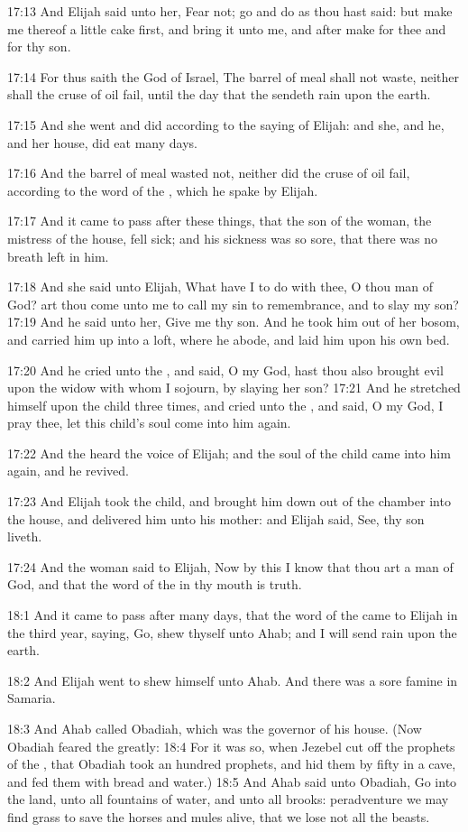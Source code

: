 17:13 And Elijah said unto her, Fear not; go and do as thou hast said:
but make me thereof a little cake first, and bring it unto me, and
after make for thee and for thy son.

17:14 For thus saith the \LORD God of Israel, The barrel of meal shall
not waste, neither shall the cruse of oil fail, until the day that the
\LORD sendeth rain upon the earth.

17:15 And she went and did according to the saying of Elijah: and she,
and he, and her house, did eat many days.

17:16 And the barrel of meal wasted not, neither did the cruse of oil
fail, according to the word of the \LORD, which he spake by Elijah.

17:17 And it came to pass after these things, that the son of the
woman, the mistress of the house, fell sick; and his sickness was so
sore, that there was no breath left in him.

17:18 And she said unto Elijah, What have I to do with thee, O thou
man of God? art thou come unto me to call my sin to remembrance, and
to slay my son?  17:19 And he said unto her, Give me thy son. And he
took him out of her bosom, and carried him up into a loft, where he
abode, and laid him upon his own bed.

17:20 And he cried unto the \LORD, and said, O \LORD my God, hast thou
also brought evil upon the widow with whom I sojourn, by slaying her
son?  17:21 And he stretched himself upon the child three times, and
cried unto the \LORD, and said, O \LORD my God, I pray thee, let this
child's soul come into him again.

17:22 And the \LORD heard the voice of Elijah; and the soul of the
child came into him again, and he revived.

17:23 And Elijah took the child, and brought him down out of the
chamber into the house, and delivered him unto his mother: and Elijah
said, See, thy son liveth.

17:24 And the woman said to Elijah, Now by this I know that thou art a
man of God, and that the word of the \LORD in thy mouth is truth.

18:1 And it came to pass after many days, that the word of the \LORD
came to Elijah in the third year, saying, Go, shew thyself unto Ahab;
and I will send rain upon the earth.

18:2 And Elijah went to shew himself unto Ahab. And there was a sore
famine in Samaria.

18:3 And Ahab called Obadiah, which was the governor of his house.
(Now Obadiah feared the \LORD greatly: 18:4 For it was so, when Jezebel
cut off the prophets of the \LORD, that Obadiah took an hundred
prophets, and hid them by fifty in a cave, and fed them with bread and
water.)  18:5 And Ahab said unto Obadiah, Go into the land, unto all
fountains of water, and unto all brooks: peradventure we may find
grass to save the horses and mules alive, that we lose not all the
beasts.

